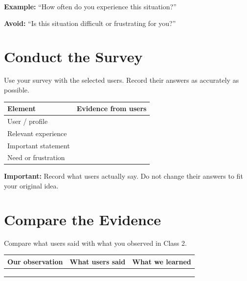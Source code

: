 \documentclass[12pt,a4paper]{article}
\begin{document}
	\textbf{Example:} ``How often do you experience this situation?''
	
	\textbf{Avoid:} ``Is this situation difficult or frustrating for you?''
	
	\section{Conduct the Survey}
	
	Use your survey with the selected users. Record their answers as accurately as possible.
	
	\begin{center}
		\small
		\begin{tabular}{|L{0.22\textwidth}|L{0.61\textwidth}|}
			\hline
			\textbf{Element} & \textbf{Evidence from users} \\
			\hline
			User / profile & \rule{0pt}{0.5cm} \\
			\hline
			Relevant experience & \rule{0pt}{0.7cm} \\
			\hline
			Important statement & \rule{0pt}{0.9cm} \\
			\hline
			Need or frustration & \rule{0pt}{0.9cm} \\
			\hline
		\end{tabular}
	\end{center}
	
	\textbf{Important:} Record what users actually say. Do not change their answers to fit your original idea.
	
	\section{Compare the Evidence}
	
	Compare what users said with what you observed in Class 2.
	
	\begin{center}
		\small
		\begin{tabular}{|L{0.33\textwidth}|L{0.33\textwidth}|L{0.33\textwidth}|}
			\hline
			\textbf{Our observation} & \textbf{What users said} & \textbf{What we learned} \\
			\hline
			\rule{0pt}{1.3cm} & \rule{0pt}{1.3cm} & \rule{0pt}{1.3cm} \\
			\hline
			\rule{0pt}{1.3cm} & \rule{0pt}{1.3cm} & \rule{0pt}{1.3cm} \\
			\hline
			\rule{0pt}{1.3cm} & \rule{0pt}{1.3cm} & \rule{0pt}{1.3cm} \\
			\hline
		\end{tabular}
	\end{center}
	
\end{document}
